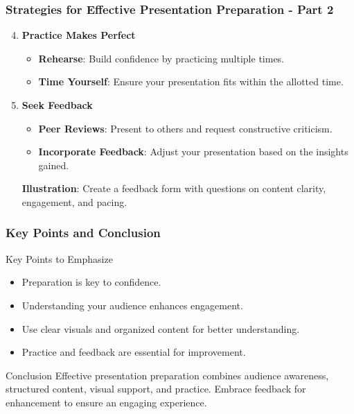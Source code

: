 \documentclass[aspectratio=169]{beamer}
\begin{document}
\begin{frame}[fragile]
    \frametitle{Strategies for Effective Presentation Preparation - Part 2}
    \begin{enumerate}
        \setcounter{enumi}{3}
        \item \textbf{Practice Makes Perfect}
            \begin{itemize}
                \item \textbf{Rehearse}: Build confidence by practicing multiple times.
                \item \textbf{Time Yourself}: Ensure your presentation fits within the allotted time.
            \end{itemize}
        
        \item \textbf{Seek Feedback}
            \begin{itemize}
                \item \textbf{Peer Reviews}: Present to others and request constructive criticism.
                \item \textbf{Incorporate Feedback}: Adjust your presentation based on the insights gained.
            \end{itemize}
            \textbf{Illustration}: Create a feedback form with questions on content clarity, engagement, and pacing.
    \end{enumerate}
\end{frame}

\begin{frame}[fragile]
    \frametitle{Key Points and Conclusion}
    \begin{block}{Key Points to Emphasize}
        \begin{itemize}
            \item Preparation is key to confidence.
            \item Understanding your audience enhances engagement.
            \item Use clear visuals and organized content for better understanding.
            \item Practice and feedback are essential for improvement.
        \end{itemize}
    \end{block}

    \begin{block}{Conclusion}
        Effective presentation preparation combines audience awareness, structured content, visual support, and practice. Embrace feedback for enhancement to ensure an engaging experience.
    \end{block}
\end{frame}
\end{document}
